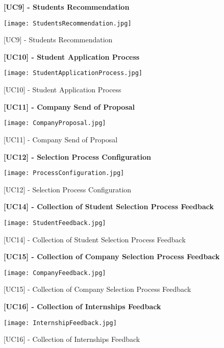 			\begin{figure}[H]
				\centering
				{\bfseries [UC9] - Students Recommendation}
				\caption{[UC9] - Students Recommendation}
				\texttt{[image: StudentsRecommendation.jpg]}
				
			\end{figure}
			
			
			\begin{figure}[H]
				\centering
				{\bfseries [UC10] - Student Application Process}
				\caption{[UC10] - Student Application Process}
				\texttt{[image: StudentApplicationProcess.jpg]}
				
			\end{figure}
			
			\begin{figure}[H]
				\centering
				{\bfseries [UC11] - Company Send of Proposal}
				\caption{[UC11] - Company Send of Proposal}
				\texttt{[image: CompanyProposal.jpg]}
				
			\end{figure}
			
			\begin{figure}[H]
				\centering
				{\bfseries [UC12] - Selection Process Configuration}
				\caption{[UC12] - Selection Process Configuration}
				\texttt{[image: ProcessConfiguration.jpg]}
				
			\end{figure}
			
			\begin{figure}[H]
				\centering
				{\bfseries [UC14] - Collection of Student Selection Process Feedback}
				\caption{[UC14] - Collection of Student Selection Process Feedback}
				\texttt{[image: StudentFeedback.jpg]}
				
			\end{figure}
			
			\begin{figure}[H]
				\centering
				{\bfseries [UC15] - Collection of Company Selection Process Feedback}
				\caption{[UC15] - Collection of Company Selection Process Feedback}
				\texttt{[image: CompanyFeedback.jpg]}
				
			\end{figure}
			
			\begin{figure}[H]
				\centering
				{\bfseries [UC16] - Collection of Internships Feedback}
				\caption{[UC16] - Collection of Internships Feedback}
				\texttt{[image: InternshipFeedback.jpg]}
				
			\end{figure}
			
